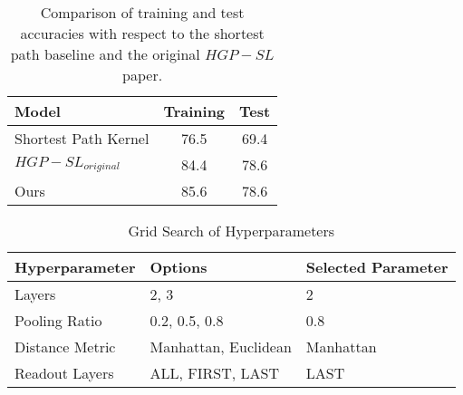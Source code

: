 \documentclass{article}
\begin{document}
\begin{table}[t]
\begin{center}
\caption{Comparison of training and test accuracies with respect to the shortest path baseline and the original $HGP-SL$ paper.}
\vspace{1mm}
\label{tab:wmt-results}
\begin{tabular}{lcc}
\toprule
\textbf{Model} & \textbf{Training} &  \textbf{Test} \\

\hline
Shortest Path Kernel  & 76.5 & 69.4\\
$HGP-SL_{original}$  & 84.4 & 78.6 \\
\hline
Ours  & 85.6 & 78.6 \\
\bottomrule
\end{tabular}
\end{center}
\end{table}



\begin{table}[h!]
\centering
\begin{tabular}{lll}
\toprule
\textbf{Hyperparameter} & \textbf{Options} & \textbf{Selected Parameter} \\
\midrule
Layers           & 2, 3                  &  2\\ 
Pooling Ratio    & 0.2, 0.5, 0.8         & 0.8 \\ 
Distance Metric  & Manhattan, Euclidean  & Manhattan \\ 
Readout Layers  & ALL, FIRST, LAST             & LAST \\ 
\bottomrule
\end{tabular}
\caption{Grid Search of Hyperparameters}
\label{tab:gridsearch}
\end{table}
\end{document}
